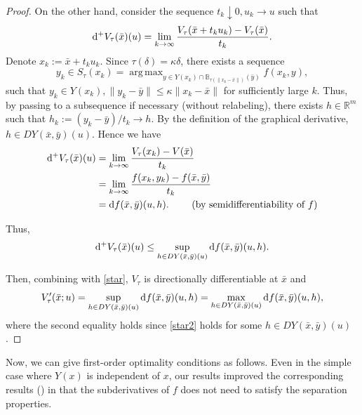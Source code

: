 \documentclass[11pt]{article}
\DeclareMathOperator*{\argmax}{arg\,max}
\numberwithin{equation}{section}
\begin{document}
{\begin{proof}
On the other hand, consider the sequence $t_k \downarrow 0, u_k \to u$ such that
$${\rm d}^+ V_{\tau} (\bar x)(u) = \lim\limits_{k \to \infty} \frac{V_{\tau}( \bar x+t_ku_k) - V_{\tau}(\bar x)}{t_k}.$$ 
Denote $x_k:= \bar x+t_ku_k$. Since $\tau(\delta)=\kappa \delta$, there exists a sequence
$$y_k \in S_{\tau}(x_k) = \argmax _{y \in Y(x_k)\cap \mathbb{B}_{\tau(\|x_k-\bar x\|)}(\bar{y})
	} f (x_k, y),$$
such that $y_k \in Y(x_k), \|y_k-\bar y\| \leq \kappa \|x_k-\bar x\|$ for sufficiently large $k$. Thus, by passing to a subsequence if necessary (without relabeling), there exists $h\in \mathbb{R}^m$ such that $h_k:=(y_k-\bar y)/t_k \to h$. By the definition of the graphical derivative, $h \in D Y(\bar x,\bar y)(u)$.
Hence we have
\begin{equation}\label{star2}
\begin{aligned}
{\rm d}^+ V_{\tau} (\bar x)(u)& =  \lim\limits_{k \to \infty} \frac{V_{\tau} (x_k)-V(\bar{x})}{t_k} \\
&= \lim\limits_{k \to \infty} \frac{f (x_k, y_k )-f(\bar{x}, \bar{y})}{t_k} \\
& = {\rm d} f(\bar x,\bar y)(u,h).   \qquad \mbox{ (by semidifferentiability of $f$)}  
\end{aligned}
\end{equation}

Thus, \begin{equation*}{\rm d}^+ V_{\tau}(\bar x)(u)  \leq \sup_{h \in D Y(\bar x,\bar y)(u)} {\rm d} f(\bar x,\bar y)(u,h).\end{equation*}

Then, combining with \eqref{star}, $V_{\tau}$ is directionally differentiable at $\bar x$ and 
\begin{equation*} V_{\tau}'(\bar x;u)  = \sup_{h \in D Y(\bar x,\bar y)(u)} {\rm d} f(\bar x,\bar y)(u,h) = \max_{h \in D Y(\bar x,\bar y)(u)} {\rm d} f(\bar x,\bar y)(u,h),\end{equation*}
where the second equality holds since \eqref{star2} holds for some $h \in D Y(\bar x,\bar y)(u)$.
\end{proof}

Now, we can give first-order optimality conditions as follows.  Even in the simple case where $Y(x)$ is independent of $x$, our results improved the corresponding results    (\cite[Theorem 4.1]{Ma2023}) in that  the subderivatives of $f$ does not need to satisfy the separation properties.

}
\end{document}
